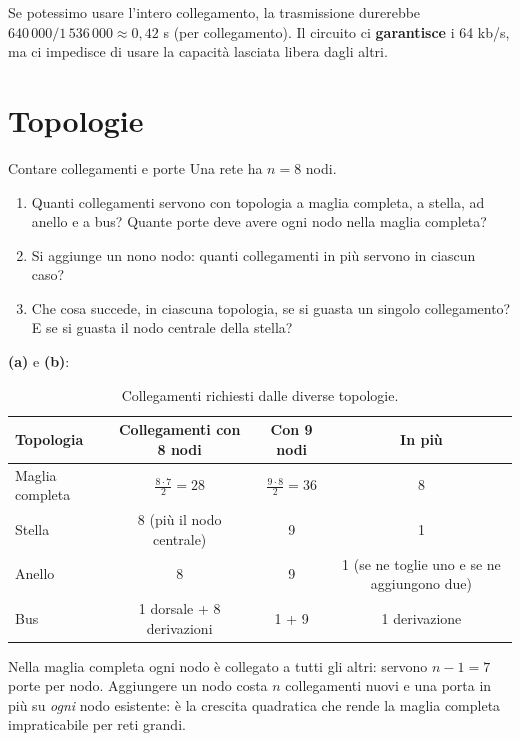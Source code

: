 Se potessimo usare l'intero collegamento, la trasmissione durerebbe $640\,000 / 1\,536\,000 \approx 0{,}42$ s (per
collegamento). Il circuito ci \textbf{garantisce} i 64 kb/s, ma ci impedisce di usare la capacità lasciata libera dagli altri.

\section{Topologie}

\begin{esercizio}{Contare collegamenti e porte}
Una rete ha $n = 8$ nodi.
\begin{enumerate}[label=(\alph*)]
    \item Quanti collegamenti servono con topologia a maglia completa, a stella, ad anello e a bus? Quante porte deve avere ogni
          nodo nella maglia completa?
    \item Si aggiunge un nono nodo: quanti collegamenti in più servono in ciascun caso?
    \item Che cosa succede, in ciascuna topologia, se si guasta un singolo collegamento? E se si guasta il nodo centrale della stella?
\end{enumerate}
\end{esercizio}

\svolgimento
\textbf{(a)} e \textbf{(b)}:
\begin{table}[H]
\centering
\begin{tabular}{lccc}
\toprule
\textbf{Topologia} & \textbf{Collegamenti con 8 nodi} & \textbf{Con 9 nodi} & \textbf{In più} \\
\midrule
Maglia completa & $\frac{8\cdot 7}{2} = 28$ & $\frac{9 \cdot 8}{2} = 36$ & 8 \\
Stella & 8 (più il nodo centrale) & 9 & 1 \\
Anello & 8 & 9 & 1 (se ne toglie uno e se ne aggiungono due) \\
Bus & 1 dorsale + 8 derivazioni & 1 + 9 & 1 derivazione \\
\bottomrule
\end{tabular}
\caption{Collegamenti richiesti dalle diverse topologie.}
\end{table}
Nella maglia completa ogni nodo è collegato a tutti gli altri: servono $n - 1 = 7$ porte per nodo. Aggiungere un nodo costa
$n$ collegamenti nuovi e una porta in più su \emph{ogni} nodo esistente: è la crescita quadratica che rende la maglia completa
impraticabile per reti grandi.

